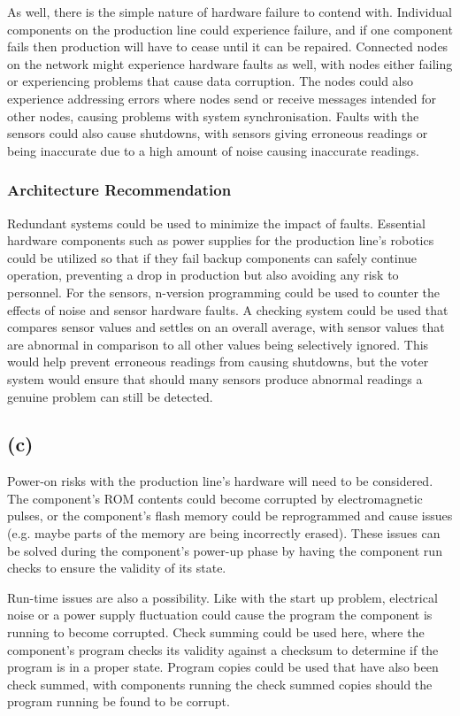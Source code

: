 \documentclass[]{report}
\begin{document}
				As well, there is the simple nature of hardware failure to contend with. Individual components on the production line could experience failure, and if one component fails then production will have to cease until it can be repaired. Connected nodes on the network might experience hardware faults as well, with nodes either failing or experiencing problems that cause data corruption. The nodes could also experience addressing errors where nodes send or receive messages intended for other nodes, causing problems with system synchronisation. Faults with the sensors could also cause shutdowns, with sensors giving erroneous readings or being inaccurate due to a high amount of noise causing inaccurate readings.
				
				\subsubsection{Architecture Recommendation}
				Redundant systems could be used to minimize the impact of faults. Essential hardware components such as power supplies for the production line's robotics could be utilized so that if they fail backup components can safely continue operation, preventing a drop in production but also avoiding any risk to personnel. For the sensors, n-version programming could be used to counter the effects of noise and sensor hardware faults. A checking system could be used that compares sensor values and settles on an overall average, with sensor values that are abnormal in comparison to all other values being selectively ignored. This would help prevent erroneous readings from causing shutdowns, but the voter system would ensure that should many sensors produce abnormal readings a genuine problem can still be detected.
						
			
			\subsection{(c)}
			Power-on risks with the production line's hardware will need to be considered. The component's ROM contents could become corrupted by electromagnetic pulses, or the component's flash memory could be reprogrammed and cause issues (e.g. maybe parts of the memory are being incorrectly erased). These issues can be solved during the component's power-up phase by having the component run checks to ensure the validity of its state.
			\medskip
			
			Run-time issues are also a possibility. Like with the start up problem, electrical noise or a power supply fluctuation could cause the program the component is running to become corrupted. Check summing could be used here, where the component's program checks its validity against a checksum to determine if the program is in a proper state. Program copies could be used that have also been check summed, with components running the check summed copies should the program running be found to be corrupt.
\end{document}
